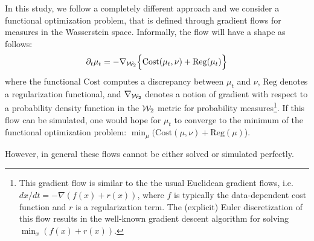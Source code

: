In this study, we follow a completely different approach and we consider a functional optimization problem, that is defined through gradient flows for measures in the Wasserstein space. Informally, the flow will have a shape as follows:
\begin{align}
\partial_t \mu_t = - \nabla_{{\cal W}_2} \Bigl\{ \mathrm{Cost}(\mu_t, \nu) + \mathrm{Reg}(\mu_t)\Bigr\} \label{eqn:gradflow}
\end{align}
where the functional $\mathrm{Cost}$ computes a discrepancy between $\mu_t$ and $\nu$, $\mathrm{Reg}$ denotes a regularization functional, and $\nabla_{{\cal W}_2}$ denotes a notion of gradient with respect to a probability density function in the ${\cal W}_2$ metric for probability measures\footnote{This gradient flow is similar to the the usual Euclidean gradient flows, i.e.\ $dx/dt = - \nabla (f(x) + r(x))$, where $f$ is typically the data-dependent cost function and $r$ is a regularization term. The (explicit) Euler discretization of this flow results in the well-known gradient descent algorithm for solving $\min_x (f(x)+r(x))$.}. If this flow can be simulated, one would hope for $\mu_t$ to converge to the minimum of the functional optimization problem: $\min_\mu ( \mathrm{Cost}(\mu, \nu) + \mathrm{Reg}(\mu)$).

However, in general these flows cannot be either solved or simulated perfectly. 
